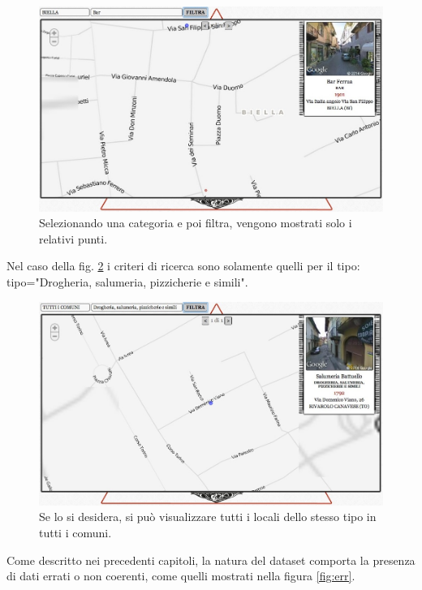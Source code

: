 \begin{figure}[ht!]
	\centering
		\includegraphics[width=\textwidth]{img/s8.jpg}
	\caption{Selezionando una categoria e poi filtra, vengono mostrati solo i relativi punti.}
	\label{fig:biella}
\end{figure}

Nel caso della fig. \ref{fig:solotipi} i criteri di ricerca sono solamente quelli per il tipo: tipo="Drogheria, salumeria, pizzicherie e simili".

\begin{figure}[ht!]
	\centering
		\includegraphics[width=\textwidth]{img/s9.jpg}
	\caption{Se lo si desidera, si pu\`o visualizzare tutti i locali dello stesso tipo in tutti i comuni.}
	\label{fig:solotipi}
\end{figure}

Come descritto nei precedenti capitoli, la natura del dataset comporta la presenza di dati errati o non coerenti, come quelli mostrati nella figura \ref{fig:err}.

